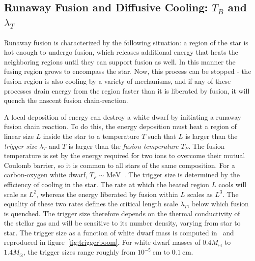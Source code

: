 \documentclass[11 pt,preprint,preprintnumbers,amsmath,amssymb, prd]{revtex4}
\newcommand{\MeV}{\text{MeV}}
\begin{document}
\begin{appendices}

\section{Runaway Fusion and Diffusive Cooling: $T_B$ and $\lambda_T$}
\label{app:boomphysics}

Runaway fusion is characterized by the following situation: a region of the star is hot enough to undergo fusion, which releases additional energy that heats the neighboring regions until they can support fusion as well. In this manner the fusing region grows to encompass the star.  Now, this process can be stopped - the fusion region is also cooling by a variety of mechanisms, and if any of these processes drain energy from the region faster than it is liberated by fusion, it will quench the nascent fusion chain-reaction. 

A local deposition of energy can destroy a white dwarf by initiating a runaway fusion chain reaction.  To do this, the energy deposition must heat a region of linear size $L$ inside the star to a temperature $T$ such that $L$ is larger than the \emph{trigger size} $\lambda_T$ and $T$ is larger than the \emph{fusion temperature} $T_F$. The fusion temperature is set by the energy required for two ions to overcome their mutual Coulomb barrier, so it is common to all stars of the same composition.  For a carbon-oxygen white dwarf, $T_F \sim \MeV$~\cite{Graham:2015apa}.  The trigger size is determined by the efficiency of cooling in the star.  The rate at which the heated region $L$ cools will scale as $L^2$, whereas the energy liberated by fusion within $L$ scales as $L^3$.  The equality of these two rates defines the critical length scale $\lambda_T$, below which fusion is quenched.  The trigger size therefore depends on the thermal conductivity of the stellar gas and will be sensitive to its number density, varying from star to star.  The trigger size as a function of white dwarf mass is computed in~\cite{Graham:2015apa} and reproduced in figure~\ref{fig:triggerboom}.  For white dwarf masses of $0.4 M_{\odot}$ to $1.4 M_{\odot}$, the trigger sizes range roughly from $10^{-5} ~\text{cm}$ to $0.1 ~\text{cm}$.


\end{appendices}
\end{document}
